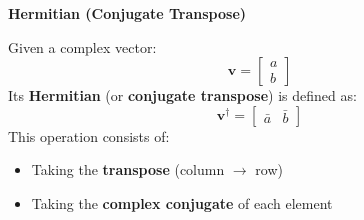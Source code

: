 \highspace
\begin{flushleft}
    \textcolor{Green3}{ \textbf{Hermitian (Conjugate Transpose)}}
\end{flushleft}
Given a complex vector:
\begin{equation*}
    \mathbf{v} =
    \begin{bmatrix}
        a \\
        b
    \end{bmatrix}
\end{equation*}
Its \textbf{Hermitian} (or \textbf{conjugate transpose}) is defined as:
\begin{equation*}
    \mathbf{v}^\dagger =
    \begin{bmatrix}
        \bar{a} & \bar{b}
    \end{bmatrix}
\end{equation*}
This operation consists of:
\begin{itemize}
    \item Taking the \textbf{transpose} (column $\rightarrow$ row)
    \item Taking the \textbf{complex conjugate} of each element
\end{itemize}